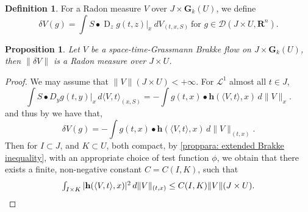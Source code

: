 \documentclass{article}
\theoremstyle{plain}
\theoremstyle{definition}
\newtheorem{definition}[theorem]{Definition}
\theoremstyle{plain}
\newtheorem{proposition}[theorem]{Proposition}
\theoremstyle{remark}
\theoremstyle{remark}
\theoremstyle{plain}
\DeclareMathOperator{\D}{D}
\begin{document}
\begin{definition}
    For a Radon measure $V$ over $J \times \mathbf{G}_{k} (U)$, we define
    \begin{equation*}
      \textstyle  \delta V (g) = \int S  \bullet \D_{z} g (t, z)|_{x} \  d V_{(t, x, S)} \ \text{for $g\in \mathscr D(J\times U,\mathbf R^n)$}.
    \end{equation*}
\end{definition}

\begin{proposition}\label{prop: first variation is a space-time Radon measure}
    Let $V$ be a space-time-Grassmann Brakke flow on $J \times \mathbf{G}_{k} (U)$, then $\| \delta V \|$ is a Radon measure over $J \times U$. 
\end{proposition}

\begin{proof}
    We may assume that $\| V \| ( J \times U) < + \infty$.
    For $\mathscr{L}^{1}$ almost all $t \in J$, 
    \begin{equation*}
        \textstyle \int S \bullet D_{y} g (t, y)|_{x} \, d \langle V, t \rangle_{(x, S)} = - \int g (t, x) \bullet \mathbf{h} (\langle V, t \rangle, x) \, d \| V \|_{x}.
    \end{equation*}
    and thus by \cite[4.1.2, Theorem C]{LW-Space-Time-GrassmannMeasureBrakkeFlow} we have that, 
    \begin{equation*}
        \textstyle \delta V (g) = - \int g (t, x) \bullet \mathbf{h} (\langle V ,t \rangle, x) \, d \| V \|_{(t, x)}.
    \end{equation*}
    Then for $I \subset J$, and $K \subset U$, both compact, by \ref{proppara: extended Brakke inequality}, with an appropriate choice of test function $\phi$, we obtain that there exists a finite, non-negative constant $C = C (I, K)$, such that
    \begin{equation*}
       \textstyle  \int_{I \times K} |\mathbf{h} (\langle V, t \rangle, x)|^{2} \, d \| V \|_{(t, x)} \leq C (I, K) \| V \| (J \times U).\qedhere
     \end{equation*}
\end{proof}
\end{document}
